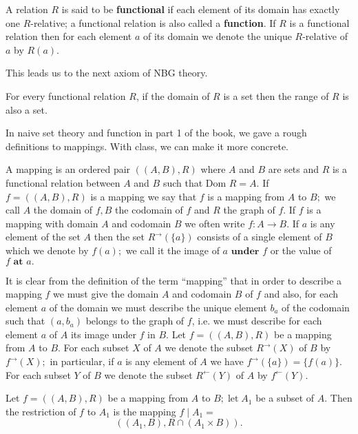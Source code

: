 \begin{definition}
    A relation $R$ is said to be \textbf{functional} if each element of its domain has exactly one $R$-relative; 
    a functional relation is also called a \textbf{function}. If $R$ is a functional relation then for each element 
    $a$ of its domain we denote the unique $R$-relative of $a$ by $R(a).$ 
\end{definition}

    This leads us to the next axiom of NBG theory.
    \begin{axiom}
        For every functional relation $R$, if the domain of $R$ is a set then the range 
        of $R$ is also a set.
    \end{axiom}

    In naive set theory and function in part 1 of the book, we gave a rough 
    definitions to mappings. With class, we can make it more concrete.
    \begin{definition}[mapping]
        A mapping is an ordered pair $((A,B),R)$ where $A$ and $B$ are sets and $R$ is a 
        functional relation between $A$ and $B$ such that Dom $R=A.$ If 
        $f= ( ( A, B) , R) $ is a mapping we say that $f$ is a mapping from 
        $A$ to $B;$ we call $A$ the domain of $f,B$ the codomain of $f$ and $R$ the 
        graph of $f$. If $f$ is a mapping with domain $A$ and codomain $B$ we often write $f:A\to B.$ 
        If $a$ is any element of the set $A$ then the set $R^{\to}(\{a\})$ consists of a single element of 
        $B$ which we denote by $f(a);$ we call it the image of $a\textbf{ under }f$ or the value of $f\textbf{ at }a.$
    \end{definition} 
    It is clear from the definition of the term “mapping” that in order to describe a mapping $f$ we must give the domain $A$ and codomain $B$ of $f$ and also, for each element $a$ of the domain we must describe the unique element $b_a$ of the codomain such that $(a,b_a)$ belongs to the graph of $f$, i.e. we must describe for each element $a$ of $A$ its image under $f$ in $B.$
    Let $f= ( ( A, B) , R) $ be a mapping from $A$ to $B$. For each subset $X$ of $A$ we denote the subset 
    $R^{\to}(X)$ of $B$ by $f^{\to}(X);$ in particular, if $a$ is any element of $A$ we have
    $f^{\to}(\{a\})=\{f(a)\}.$ For each subset $Y$ of $B$ we denote the subset $R^{\leftarrow }( Y) $ 
    of $A$ by $f^{\leftarrow }( Y) .$

    Let $ f=((A,B),R)$ be a mapping from $A$ to $B;\operatorname*{let}A_1$ be a subset of $A.$ Then the restriction of $f$ to $A_1$ is the mapping $f\mid A_1=$
    $$
    ((A_1,B),R\cap(A_1\times B)).
    $$

